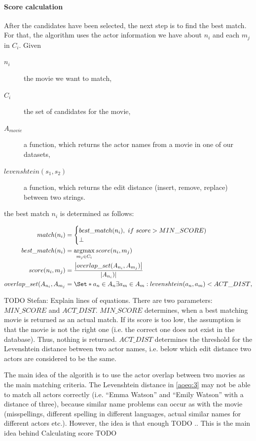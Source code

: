 \paragraph{Score calculation}
After the candidates have been selected, the next step is to find the best match.
For that, the algorithm uses the actor information we have about $n_i$ and each $m_j$ in $C_i$.
Given
\begin{description}
	\item[$n_i$] the movie we want to match,
	\item[$C_i$] the set of candidates for the movie,
	\item[$A_{movie}$] a function, which returns the actor names from a movie in one of our datasets,
	\item[$levenshtein(s_1, s_2)$] a function, which returns the edit distance (insert, remove, replace) between two strings.
\end{description}
the best match $n_i$ is determined as follows:

\begin{align}
	match(n_i) &=
		\begin{cases}
			best\_match(n_i),~if~score > MIN\_SCORE) \\
			\bot
		\end{cases} \\
	best\_match(n_i) &=
		\argmax_{m_j \in C_i} score(n_i, m_j)\label{aoeq:1}\\
	score(n_i, m_j) &=
		\frac
			{\left\lvert overlap\_set(A_{n_i}, A_{m_j}) \right\rvert}
			{\left\lvert A_{n_i}) \right\rvert}\label{aoeq:2}\\
	overlap\_set(A_{n_i}, A_{m_j} &=
		\Set*{a_n \in A_n}{\exists a_m \in A_m: levenshtein(a_n, a_m) < ACT\_DIST},\label{aoeq:3}
\end{align}

TODO Stefan: Explain lines of equations.
There are two parameters: $MIN\_SCORE$ and $ACT\_DIST$.
$MIN\_SCORE$ determines, when a best matching movie is returned as an actual match.
If its score is too low, the assumption is that the movie is not the right one (i.e. the correct one does not exist in the database).
Thus, nothing is returned.
$ACT\_DIST$ determines the threshold for the Levenshtein distance between two actor names, i.e. below which edit distance two actors are considered to be the same.

The main idea of the algorith is to use the actor overlap between two movies as the main matching criteria.
The Levenshtein distance in \ref{aoeq:3} may not be able to match all actors correctly (i.e. "`Emma Watson"' and "`Emily Watson"' with a distance of three), because similar name problems can occur as with the movie (misspellings, different spelling in different languages, actual similar names for different actors etc.).
However, the idea is that enough TODO ..
This is the main idea behind 
Calculating score TODO

